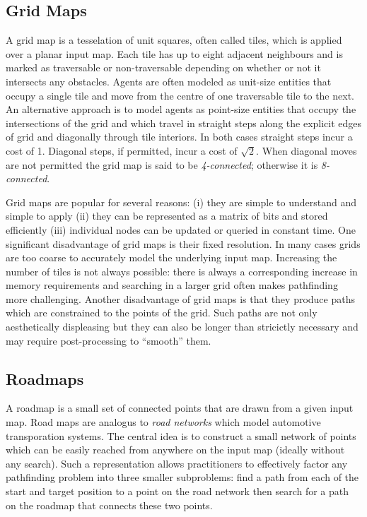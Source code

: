 \subsection{Grid Maps}
\label{cha::lit::graphs::grid}
A grid map is a tesselation of unit squares, often called tiles, which is
applied over a planar input map. Each tile has up to eight adjacent neighbours
and is marked as traversable or non-traversable depending on whether or not it
intersects any obstacles.  Agents are often modeled as unit-size entities that
occupy a single tile and move from the centre of one traversable tile to the
next.  
An alternative approach is to model agents as point-size entities that occupy 
the intersections of the grid and which travel in straight steps along the
explicit edges of grid and diagonally through tile interiors.
In both cases straight steps incur a cost of 1. Diagonal steps, if permitted, 
incur a cost of $\sqrt{2}$.  When diagonal moves are not permitted the grid map 
is said to be \emph{4-connected}; otherwise it is \emph{8-connected}.  

Grid maps are popular for several reasons: (i) they are simple to understand 
and simple to apply (ii) they can be represented as a matrix of bits and stored
efficiently (iii) individual nodes can be updated or queried in constant time.
One significant disadvantage of grid maps is their fixed resolution. In many cases 
grids are too coarse to accurately model the underlying input map. Increasing the
number of tiles is not always possible: there is always a corresponding increase in
memory requirements and searching in a larger grid often makes pathfinding more 
challenging.
Another disadvantage of grid maps is that they produce paths which are
constrained to the points of the grid. Such paths are not only aesthetically
displeasing but they can also be longer than stricictly necessary and may
require post-processing to ``smooth'' them.

\subsection{Roadmaps}
\label{cha::lit::graphs::road}
A roadmap is a small set of connected points that are drawn from a given
input map. Road maps are analogus to \emph{road networks} which model automotive 
transporation systems.  The central idea is to construct a small network of points
which can be easily reached from anywhere on the input map (ideally
without any search).  Such a representation allows practitioners to effectively
factor any pathfinding problem into three smaller subproblems: find a path from
each of the start and target position to a point on the road network then search 
for a path on the roadmap that connects these two points.

